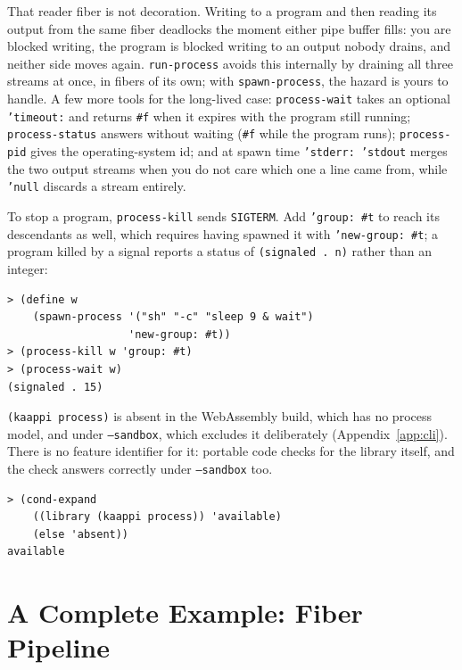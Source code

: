 That reader fiber is not decoration. Writing to a program and then reading its output from the same fiber deadlocks the moment either pipe buffer fills: you are blocked writing, the program is blocked writing to an output nobody drains, and neither side moves again. \texttt{run-process} avoids this internally by draining all three streams at once, in fibers of its own; with \texttt{spawn-process}, the hazard is yours to handle. A few more tools for the long-lived case: \texttt{process-wait} takes an optional \texttt{'timeout:} and returns \texttt{\#f} when it expires with the program still running; \texttt{process-status} answers without waiting (\texttt{\#f} while the program runs); \texttt{process-pid} gives the operating-system id; and at spawn time \texttt{'stderr: 'stdout} merges the two output streams when you do not care which one a line came from, while \texttt{'null} discards a stream entirely.

To stop a program, \texttt{process-kill} sends \texttt{SIGTERM}. Add \texttt{'group: \#t} to reach its descendants as well, which requires having spawned it with \texttt{'new-group: \#t}; a program killed by a signal reports a status of \texttt{(signaled . n)} rather than an integer:

\begin{lstlisting}[style=repl]
> (define w
    (spawn-process '("sh" "-c" "sleep 9 & wait")
                   'new-group: #t))
> (process-kill w 'group: #t)
> (process-wait w)
(signaled . 15)
\end{lstlisting}

\begin{note}
\texttt{(kaappi process)} is absent in the WebAssembly build, which has no process model, and under \texttt{--sandbox}, which excludes it deliberately (Appendix~\ref{app:cli}). There is no feature identifier for it: portable code checks for the library itself, and the check answers correctly under \texttt{--sandbox} too.

\begin{lstlisting}[style=repl]
> (cond-expand
    ((library (kaappi process)) 'available)
    (else 'absent))
available
\end{lstlisting}
\end{note}

\section{A Complete Example: Fiber Pipeline}

